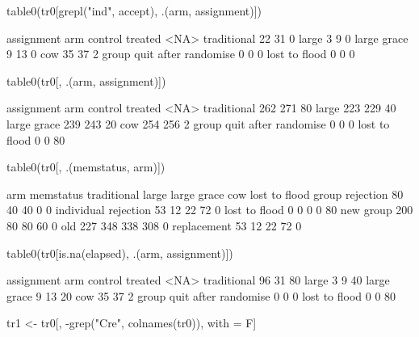 \begin{Schunk}
\begin{Sinput}
table0(tr0[grepl("ind", accept), .(arm, assignment)])
\end{Sinput}
\begin{Soutput}
                            assignment
arm                          control treated <NA>
  traditional                     22      31    0
  large                            3       9    0
  large grace                      9      13    0
  cow                             35      37    2
  group quit after randomise       0       0    0
  lost to flood                    0       0    0
\end{Soutput}
\begin{Sinput}
table0(tr0[, .(arm, assignment)])
\end{Sinput}
\begin{Soutput}
                            assignment
arm                          control treated <NA>
  traditional                    262     271   80
  large                          223     229   40
  large grace                    239     243   20
  cow                            254     256    2
  group quit after randomise       0       0    0
  lost to flood                    0       0   80
\end{Soutput}
\begin{Sinput}
table0(tr0[, .(memstatus, arm)])
\end{Sinput}
\begin{Soutput}
                      arm
memstatus              traditional large large grace cow lost to flood
  group rejection               80    40          40   0             0
  individual rejection          53    12          22  72             0
  lost to flood                  0     0           0   0            80
  new group                    200    80          80  60             0
  old                          227   348         338 308             0
  replacement                   53    12          22  72             0
\end{Soutput}
\begin{Sinput}
table0(tr0[is.na(elapsed), .(arm, assignment)])
\end{Sinput}
\begin{Soutput}
                            assignment
arm                          control treated <NA>
  traditional                     96      31   80
  large                            3       9   40
  large grace                      9      13   20
  cow                             35      37    2
  group quit after randomise       0       0    0
  lost to flood                    0       0   80
\end{Soutput}
\begin{Sinput}
tr1 <- tr0[, -grep("Cre", colnames(tr0)), with = F]
\end{Sinput}
\end{Schunk}
